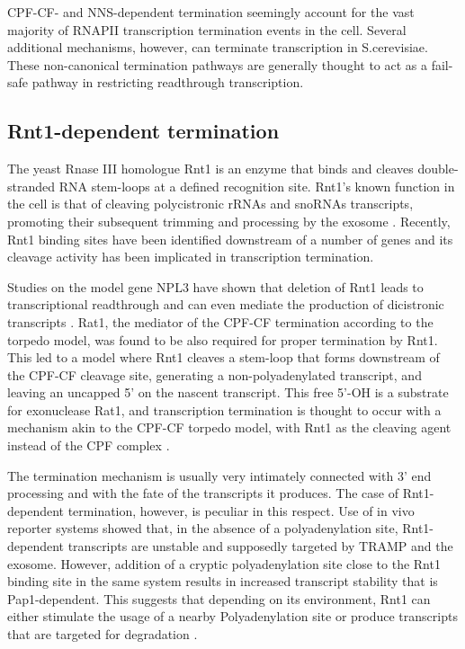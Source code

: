 CPF-CF- and NNS-dependent termination seemingly account for the vast majority of RNAPII transcription termination events in the cell.
Several additional mechanisms, however, can terminate transcription in S.cerevisiae. 
These non-canonical termination pathways are generally thought to act as a fail-safe pathway in restricting readthrough transcription\cite{colin:2014:roadblock,ghazal:2005:genomewide}.


\subsection{Rnt1-dependent termination}

The yeast Rnase III homologue Rnt1 is an enzyme that binds and cleaves double-stranded RNA stem-loops at a defined recognition site. 
Rnt1’s known function in the cell is that of cleaving polycistronic rRNAs and snoRNAs transcripts, promoting their subsequent trimming and processing by the exosome \cite{ghazal:2005:genomewide}. 
Recently, Rnt1 binding sites have been identified downstream of a number of genes and its cleavage activity has been implicated in transcription termination.

Studies on the model gene NPL3 have shown that deletion of Rnt1 leads to transcriptional readthrough and can even mediate the production of dicistronic transcripts \cite{ghazal:2009:yeast}. 
Rat1, the mediator of the CPF-CF termination according to the torpedo model, was found to be also required for proper termination by Rnt1. 
This led to a model where Rnt1 cleaves a stem-loop that forms downstream of the CPF-CF cleavage site, generating a non-polyadenylated transcript, and leaving an uncapped 5’ on the nascent transcript. 
This free 5’-OH is a substrate for exonuclease Rat1, and transcription termination is thought to occur with a mechanism akin to the CPF-CF torpedo model, with Rnt1 as the cleaving agent instead of the CPF complex \cite{ghazal:2009:yeast, rondo:2009:failsafe}.

The termination mechanism is usually very intimately connected with 3’ end processing and with the fate of the transcripts it produces. The case of Rnt1-dependent termination, however, is peculiar in this respect.
Use of in vivo reporter systems showed that, in the absence of a polyadenylation site, Rnt1-dependent transcripts are unstable and supposedly targeted by TRAMP and the exosome\cite{ghazal:2009:yeast}. 
However, addition of a cryptic polyadenylation site close to the Rnt1 binding site in the same system results in increased transcript stability that is Pap1-dependent. 
This suggests that depending on its environment, Rnt1 can either stimulate the usage of a nearby Polyadenylation site or produce transcripts that are targeted for degradation \cite{rondo:2009:failsafe}.

